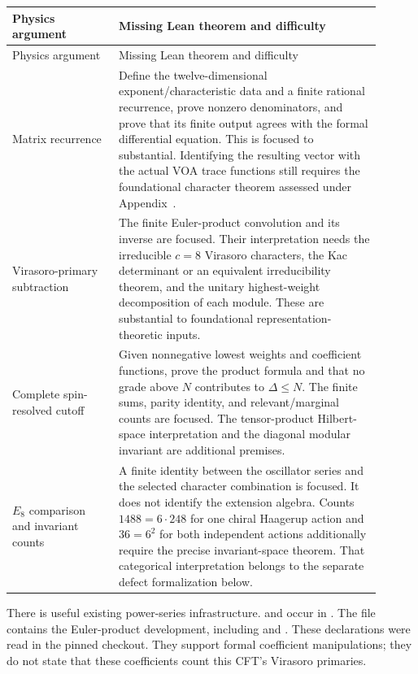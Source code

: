 \begin{longtable}{@{}P{0.26\linewidth}P{0.64\linewidth}@{}}
\toprule
Physics argument & Missing Lean theorem and difficulty\\
\midrule\endfirsthead
\toprule Physics argument & Missing Lean theorem and difficulty\\
\midrule\endhead\bottomrule\endfoot
Matrix recurrence
& Define the twelve-dimensional exponent/characteristic data and a
finite rational recurrence, prove nonzero denominators, and prove that
its finite output agrees with the formal differential equation.
This is focused to substantial. Identifying the resulting vector with
the actual VOA trace functions still requires the foundational
character theorem assessed under Appendix~.\\
Virasoro-primary subtraction
& The finite Euler-product convolution and its inverse are focused.
Their interpretation needs the irreducible $c=8$ Virasoro characters,
the Kac determinant or an equivalent irreducibility theorem, and the
unitary highest-weight decomposition of each module. These are
substantial to foundational representation-theoretic inputs.\\
Complete spin-resolved cutoff
& Given nonnegative lowest weights and coefficient functions, prove
the product formula and that no grade above $N$ contributes to
$\Delta\leq N$. The finite sums, parity identity, and relevant/marginal
counts are focused. The tensor-product Hilbert-space interpretation
and the diagonal modular invariant are additional premises.\\
$E_8$ comparison and invariant counts
& A finite identity between the oscillator series and the selected
character combination is focused. It does not identify the extension
algebra. Counts $1488=6\cdot248$ for one chiral Haagerup action and
$36=6^2$ for both independent actions additionally require the precise
invariant-space theorem. That categorical interpretation belongs to
the separate defect formalization below.\\
\end{longtable}

There is useful existing power-series infrastructure.
 and  occur
in .
The file
contains the Euler-product development, including
 and
.
These declarations were read in the pinned checkout. They support
formal coefficient manipulations; they do not state that these
coefficients count this CFT's Virasoro primaries.

